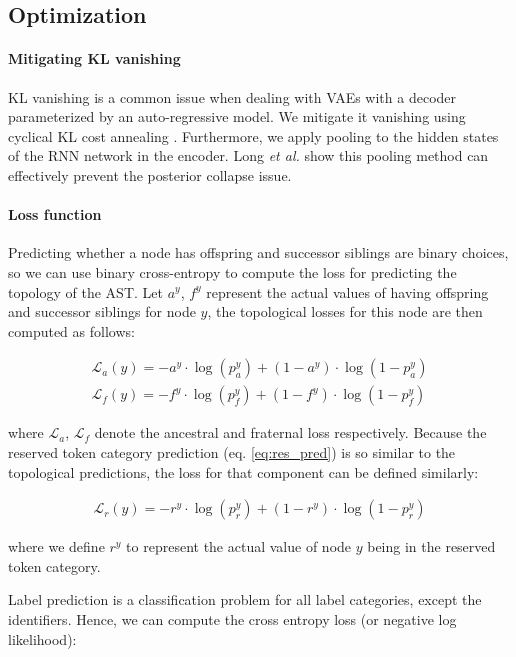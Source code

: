 \subsection{Optimization}

\paragraph{Mitigating KL vanishing}
KL vanishing is a common issue when dealing with VAEs with a decoder parameterized by an auto-regressive model.
We mitigate it vanishing using cyclical KL cost annealing \cite{fu2019cyclical}. Furthermore, we apply pooling to the hidden states of the RNN network in the encoder. Long \textit{et al.} \cite{long2019preventing} show this pooling method can effectively prevent the posterior collapse issue. 

\paragraph{Loss function}
Predicting whether a node has offspring and successor siblings are binary choices, so we can use binary cross-entropy to compute the loss for predicting the topology of the AST. 
Let $a^y$, $f^y$ represent the actual values of having offspring and successor siblings for node $y$, the topological losses for this node are then computed as follows:

\begin{align}
    \mathcal{L}_{a}(y) = - a^y \cdot \log(p^y_a) + (1 - a^y) \cdot \log(1 - p^y_a) \\
    \mathcal{L}_{f}(y) = - f^y \cdot \log(p^y_f) + (1 - f^y) \cdot \log(1 - p^y_f)
\end{align}

\noindent where $\mathcal{L}_{a}$, $\mathcal{L}_{f}$ denote the ancestral and fraternal loss respectively. Because the reserved token category prediction (eq. \ref{eq:res_pred}) is so similar to the topological predictions, the loss for that component can be defined similarly:

\begin{align}
    \mathcal{L}_{r}(y) = - r^y \cdot \log(p^y_r) + (1 - r^y) \cdot \log(1 - p^y_r)
\end{align}

\noindent where we define $r^y$ to represent the actual value of node $y$ being in the reserved token category. 



Label prediction is a classification problem for all label categories, except the identifiers.
Hence, we can compute the cross entropy loss (or negative log likelihood):

